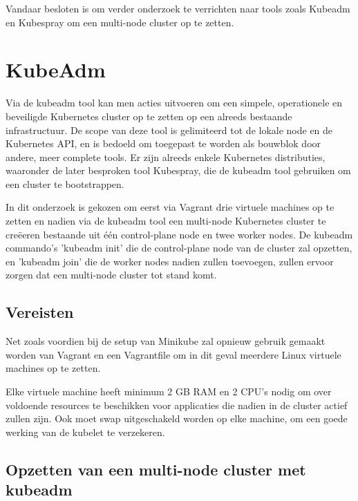 Vandaar besloten is om verder onderzoek te verrichten naar tools zoals Kubeadm en Kubespray om een multi-node cluster op te zetten.    

\section{KubeAdm}

Via de kubeadm tool kan men acties uitvoeren om een simpele, operationele en beveiligde Kubernetes cluster op te zetten op een alreeds bestaande infrastructuur. De scope van deze tool is gelimiteerd tot de lokale node en de Kubernetes API, en is bedoeld om toegepast te worden als bouwblok door andere, meer complete tools. \autocite{Kubeadm2021}
Er zijn alreeds enkele Kubernetes distributies, waaronder de later besproken tool Kubespray, die de kubeadm tool gebruiken om een cluster te bootstrappen.     

In dit onderzoek is gekozen om eerst via Vagrant drie virtuele machines op te zetten  en nadien via de kubeadm tool een multi-node Kubernetes cluster te creëeren bestaande uit één control-plane node en twee worker nodes. De kubeadm commando's 'kubeadm init' die de control-plane node van de cluster zal opzetten, en 'kubeadm join' die de worker nodes nadien zullen toevoegen, zullen ervoor zorgen dat een multi-node cluster tot stand komt.

\subsection{Vereisten}

Net zoals voordien bij de setup van Minikube zal opnieuw gebruik gemaakt worden van Vagrant en een Vagrantfile om in dit geval meerdere Linux virtuele machines op te zetten.

Elke virtuele machine heeft minimum 2 GB RAM en 2 CPU's nodig om over voldoende resources te beschikken voor applicaties die nadien in de cluster actief zullen zijn. Ook moet swap uitgeschakeld worden op elke machine, om een goede werking van de kubelet te verzekeren. \autocite{Kubernetes2022a}

\subsection{Opzetten van een multi-node cluster met kubeadm}

